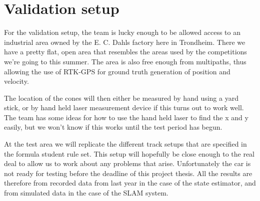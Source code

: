 \section{Validation setup}
For the validation setup, the team is lucky enough to be allowed access to an industrial area owned by the E. C. Dahls factory here in Trondheim. There we have a pretty flat, open area that resembles the areas used by the competitions we're going to this summer. The area is also free enough from multipaths, thus allowing the use of RTK-GPS for ground truth generation of position and velocity. 

The location of the cones will then either be measured by hand using a yard stick, or by hand held laser measurement device if this turns out to work well. The team has some ideas for how to use the hand held laser to find the x and y easily, but we won't know if this works until the test period has begun. 

At the test area we will replicate the different track setups that are specified in the formula student rule set. This setup will hopefully be close enough to the real deal to allow us to work about any problems that arise. Unfortunately the car is not ready for testing before the deadline of this project thesis. All the results are therefore from recorded data from last year in the case of the state estimator, and from simulated data in the case of the SLAM system. 

